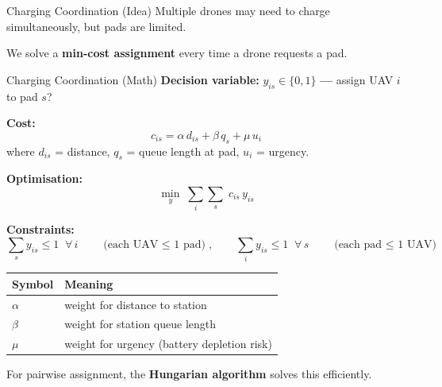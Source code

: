 \documentclass[aspectratio=169,12pt]{beamer}
\begin{document}
\begin{frame}{Charging Coordination (Idea)}
Multiple drones may need to charge simultaneously, but pads are limited.

\vspace{0.4em}
\begin{center}
\end{center}

\vspace{0.3em}
We solve a \textbf{min-cost assignment} every time a drone requests a pad.
\end{frame}

\begin{frame}{Charging Coordination (Math)}
\textbf{Decision variable:}
$y_{is} \in \{0,1\}$ \textbf{---} assign UAV $i$ to pad $s$?

\vspace{0.3em}
\textbf{Cost:}
\[
c_{is} = \alpha\, d_{is} + \beta\, q_s + \mu\, u_i
\]
where $d_{is}$ = distance, $q_s$ = queue length at pad, $u_i$ = urgency.

\vspace{0.3em}
\textbf{Optimisation:}
\[
\min_{y}\; \sum_{i}\sum_{s}\; c_{is}\, y_{is}
\]

\vspace{0.3em}
\textbf{Constraints:}
\[
\sum_{s} y_{is} \le 1 \;\;\forall\, i
\qquad\text{(each UAV $\le$ 1 pad)},
\qquad
\sum_{i} y_{is} \le 1 \;\;\forall\, s
\qquad\text{(each pad $\le$ 1 UAV)}
\]

\vspace{0.3em}
\begin{tabular}{@{}ll@{}}
\toprule
\textbf{Symbol} & \textbf{Meaning} \\
\midrule
$\alpha$ & weight for distance to station \\
$\beta$ & weight for station queue length \\
$\mu$ & weight for urgency (battery depletion risk) \\
\bottomrule
\end{tabular}

\vspace{0.3em}
For pairwise assignment, the \textbf{Hungarian algorithm} solves this efficiently.
\end{frame}
\end{document}
